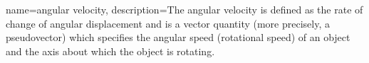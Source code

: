 {
    name=angular velocity,
    description={The angular velocity is defined as the rate of change of angular displacement and is a vector quantity (more precisely, a pseudovector) which specifies the angular speed (rotational speed) of an object and the axis about which the object is rotating.}
}
